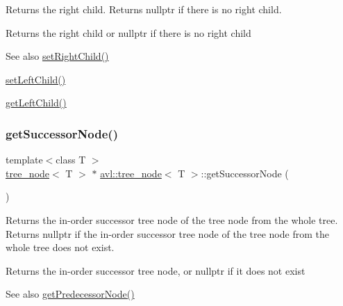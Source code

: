 Returns the right child. Returns nullptr if there is no right child. \begin{DoxyReturn}{Returns}
the right child or nullptr if there is no right child 
\end{DoxyReturn}
\begin{DoxySeeAlso}{See also}
\hyperlink{classavl_1_1tree__node_a09a51bcee333bbd509e3edb96179ae7e}{set\+Right\+Child()} 

\hyperlink{classavl_1_1tree__node_a21990bf288cf0ec0572e53afbacb9b35}{set\+Left\+Child()} 

\hyperlink{classavl_1_1tree__node_ad12a5f6a41cfc6203913c5b6bce30837}{get\+Left\+Child()} 
\end{DoxySeeAlso}
\mbox{\label{classavl_1_1tree__node_aa25a278d7fe3d4d83846bbf7fc256116}} 
\subsubsection{\texorpdfstring{get\+Successor\+Node()}{getSuccessorNode()}}
{\footnotesize\ttfamily template$<$class T $>$ \\
\hyperlink{classavl_1_1tree__node}{tree\+\_\+node}$<$ T $>$ $\ast$ \hyperlink{classavl_1_1tree__node}{avl\+::tree\+\_\+node}$<$ T $>$\+::get\+Successor\+Node (\begin{DoxyParamCaption}{ }\end{DoxyParamCaption})}

Returns the in-\/order successor tree node of the tree node from the whole tree. Returns nullptr if the in-\/order successor tree node of the tree node from the whole tree does not exist. \begin{DoxyReturn}{Returns}
the in-\/order successor tree node, or nullptr if it does not exist 
\end{DoxyReturn}
\begin{DoxySeeAlso}{See also}
\hyperlink{classavl_1_1tree__node_af865187e8d61080dd1720a28195a0c1f}{get\+Predecessor\+Node()} 
\end{DoxySeeAlso}
\mbox{\label{classavl_1_1tree__node_a3aabce32e81215733da2f6fff33a4809}} 
